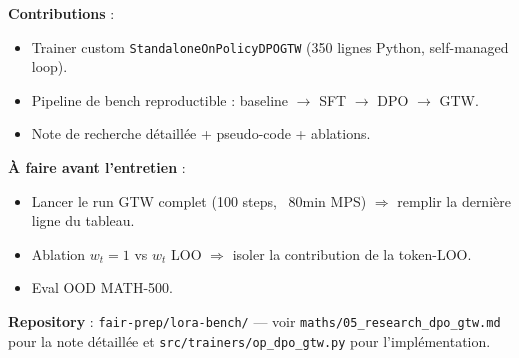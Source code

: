 \documentclass[10pt,a4paper]{article}
\begin{document}
\textbf{Contributions} :
\begin{itemize}[leftmargin=*]
  \item Trainer custom \texttt{StandaloneOnPolicyDPOGTW} (350 lignes Python, self-managed loop).
  \item Pipeline de bench reproductible : baseline $\to$ SFT $\to$ DPO $\to$ GTW.
  \item Note de recherche détaillée + pseudo-code + ablations.
\end{itemize}

\textbf{À faire avant l'entretien} :
\begin{itemize}[leftmargin=*]
  \item Lancer le run GTW complet (100 steps, ~80min MPS) $\Rightarrow$ remplir la dernière ligne du tableau.
  \item Ablation $w_t = 1$ vs $w_t$ LOO $\Rightarrow$ isoler la contribution de la token-LOO.
  \item Eval OOD MATH-500.
\end{itemize}

\textbf{Repository} : \texttt{fair-prep/lora-bench/} --- voir \texttt{maths/05\_research\_dpo\_gtw.md} pour la note détaillée et \texttt{src/trainers/op\_dpo\_gtw.py} pour l'implémentation.
\end{document}
